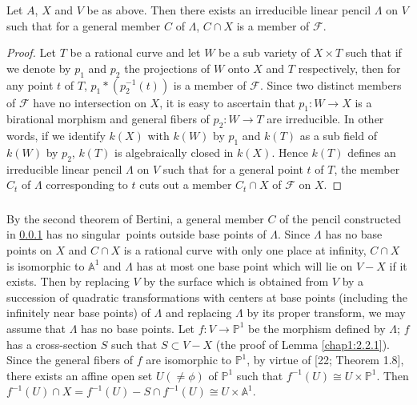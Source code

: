 \subsubsection{}\label{chap1:2.3.2}
\begin{lemma*}
  Let $A$, $X$ and $V$ be as above. Then there exists an irreducible
  linear pencil $\Lambda$ on $V$ such that for a general member $C$ of
  $\Lambda$, $C\cap X$ is a member of $\mathscr{F}$.
\end{lemma*}

\begin{proof}
Let $T$ be a rational curve and let $W$ be a sub variety of $X\times T$
such that if we denote by $p_{1}$ and $p_{2}$ the projections of $W$
onto $X$ and $T$ respectively, then for any point $t$ of $T$,
$p_{1}\ast (p^{-1}_{2}(t))$ is a member of $\mathscr{F}$. Since two
distinct members of $\mathscr{F}$ have no intersection on $X$, it is
easy to ascertain that $p_{1}:W\to X$ is a birational morphism and
general fibers of $p_{2}:W\to T$ are irreducible. In other words, if
we identify $k(X)$ with $k(W)$ by $p_{1}$ and $k(T)$ as a sub field of
$k(W)$ by $p_{2}$, $k(T)$ is algebraically closed in $k(X)$. Hence
$k(T)$ defines an irreducible linear pencil $\Lambda$ on $V$ such that
for a general point $t$ of $T$, the member $C_{t}$ of $\Lambda$
corresponding to $t$ cuts out a member $C_{t}\cap X$ of $\mathscr{F}$
on $X$.
\end{proof}

\subsubsection{}\label{chap1:2.3.3}
\begin{proofofthetheorem*}
By the second theorem of Bertini, a general member $C$ of the pencil
constructed in \ref{chap1:2.3.2} has no singular\pageoriginale\ points outside base
points of $\Lambda$. Since $\Lambda$ has no base points on $X$ and
$C\cap X$ is a rational curve with only one place at infinity, $C\cap
X$ is isomorphic to $\mathbb{A}^{1}$ and $\Lambda$ has at most one
base point which will lie on $V-X$ if it exists. Then by replacing $V$
by the surface which is obtained from $V$ by a succession of quadratic
transformations with centers at base points (including the infinitely
near base points) of $\Lambda$ and replacing $\Lambda$ by its proper
transform, we may assume that $\Lambda$ has no base points. Let
$f:V\to \mathbb{P}^{1}$ be the morphism defined by $\Lambda$; $f$ has
a cross-section $S$ such that $S\subset V-X$ (\cf the proof of Lemma
\ref{chap1:2.2.1}). Since the general fibers of $f$ are isomorphic to
$\mathbb{P}^{1}$, by virtue of [22; Theorem 1.8], there exists an
affine open set $U(\neq \phi)$ of $\mathbb{P}^{1}$ such that
$f^{-1}(U)\cong U\times\mathbb{P}^{1}$. Then $f^{-1}(U)\cap
X=f^{-1}(U)-S\cap f^{-1}(U)\cong U\times \mathbb{A}^{1}$.  
\end{proofofthetheorem*}

